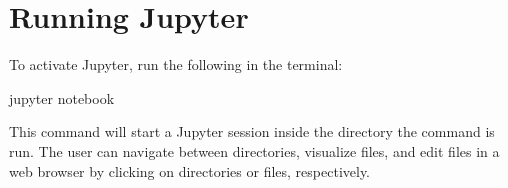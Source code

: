 \documentclass[letterpaper,10pt,english]{sphinxhowto}
\begin{document}
\section{Running Jupyter}
\label{\detokenize{index:running-jupyter}}
\sphinxAtStartPar
To activate Jupyter, run the following in the terminal:

\begin{sphinxVerbatim}[commandchars=\\\{\}]
\PYGZdl{} jupyter notebook
\end{sphinxVerbatim}

\sphinxAtStartPar
This command will start a Jupyter session inside the directory the command is run. The user can navigate between directories, visualize files, and edit files in a web browser by clicking on directories or files, respectively.
\end{document}
